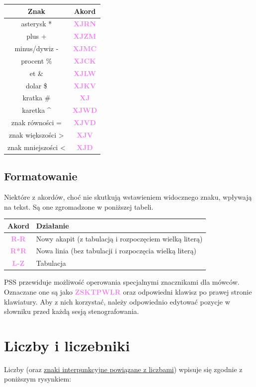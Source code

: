 \documentclass[12p, oneside]{book}
\newcommand{\steno}[1]{\textbf{\textsf{\textcolor{violet}{ #1}}}}
\begin{document}
\begin{tabular}{| c | c |}
	\hline
	Znak & Akord \\ \hline
	asterysk * & \steno{XJRN} \\ \hline
	plus + & \steno{XJZM} \\ \hline
	minus/dywiz - & \steno{XJMC} \\ \hline
	procent \% & \steno{XJCK} \\ \hline
	et \& & \steno{XJLW} \\ \hline
	dolar \$ & \steno{XJKV} \\ \hline
	kratka \# & \steno{XJ} \\ \hline
	karetka \^ & \steno{XJWD} \\ \hline
	znak równości = & \steno{XJVD} \\ \hline
	znak większości > & \steno{XJV} \\ \hline
	znak mniejszości < & \steno{XJD} \\ \hline
\end{tabular}

\subsection{Formatowanie}

Niektóre z akordów, choć nie skutkują wstawieniem widocznego znaku, wpływają na 
tekst. Są one zgromadzone w poniższej tabeli.

\begin{tabular}{| c | p{5cm} |}
	\hline
	Akord & Działanie \\ \hline
	\steno{R-R} & Nowy akapit (z tabulacją i rozpoczęciem wielką literą)\\ 
	\hline
	\steno{R*R} & Nowa linia (bez tabulacji i rozpoczęcia wielką literą)\\ 
	\hline
	\steno{L-Z} & Tabulacja \\ \hline
\end{tabular}

PSS przewiduje możliwość operowania specjalnymi znacznikami dla mówców. Oznaczane one są jako \steno{ZSKTPWLR} oraz odpowiedni klawisz po prawej stronie klawiatury. Aby z nich korzystać, należy odpowiednio edytować pozycje w słowniku przed każdą sesją stenografowania.

\newpage

\section{Liczby i liczebniki}
\label{sec:liczby}
Liczby (oraz \hyperref[znaki_liczbowe]{znaki interpunkcyjne powiązane z liczbami}) wpisuje się zgodnie z poniższym rysynkiem:
\end{document}

